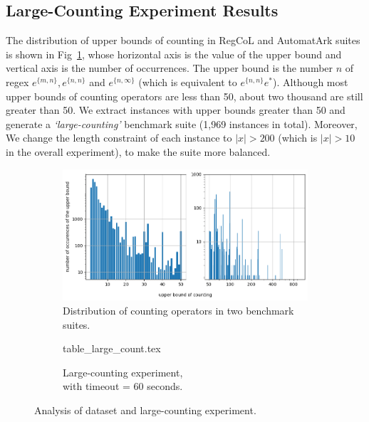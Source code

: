 \vspace{-3mm}
\subsection{Large-Counting Experiment Results}
The distribution of upper bounds of counting in RegCoL and AutomatArk suites is shown in Fig~\ref{fig:count_distri}, whose horizontal axis is the value of the upper bound and vertical axis is the number of occurrences. The upper bound is the number $n$ of regex $e^{\{m,n\}}, e^{\{n,n\}}$ and $e^{\{n,\infty\}}$ (which is equivalent to $e^{\{n,n\}}e^*$). Although most upper bounds of counting operators are less than 50, about two thousand are still greater than 50. We extract instances with upper bounds greater than 50 and generate a \emph{`large-counting'} benchmark suite (1,969 instances in total). Moreover, We change the length constraint of each instance to $|x| > 200$ (which is $|x| > 10$ in the overall experiment), to make the suite more balanced.
\vspace{-5mm}
\begin{figure}[ht]
  \centering
  \begin{subfigure}[t]{0.49\textwidth}
    \centering\vskip 0pt
    \includegraphics[width=1\textwidth]{counting_distribution.png}  
    \caption{Distribution of counting operators in two benchmark suites.}  
    \label{fig:count_distri}
  \end{subfigure}
  \hfill
  \begin{subfigure}[t]{0.49\textwidth}
    \centering\vskip 0pt
    {table_large_count.tex}
    \vspace{4.5mm}
    \caption{Large-counting experiment, \\with timeout = 60 seconds.}
    \label{fig:table_large_count}
  \end{subfigure}
  \vspace{-2mm}
  \caption{Analysis of dataset and large-counting experiment.}
\end{figure}
\vspace{-5mm}

